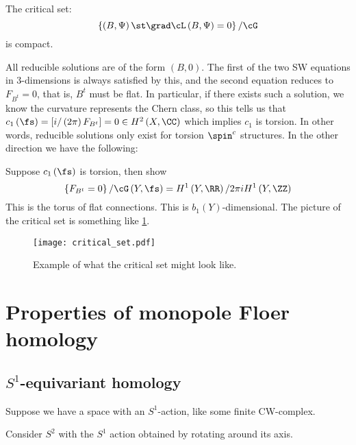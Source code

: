 \documentclass{amsart}
\begin{document}
\begin{fact}
The critical set:
\begin{equation}
\left\{ \left( B , \Psi \right) \st
\grad \cL\left( B , \Psi \right) = 0\right\} / \cG
\end{equation}
is compact.
\end{fact}

All reducible solutions are of the form $\left( B , 0 \right)$.
The first of the two SW equations in $3$-dimensions is always satisfied by this, 
and the second equation reduces to
$F_{B^t} =0$, that is, $B^t$ must be flat.
In particular, if there exists such a solution, 
we know the curvature represents the Chern class, 
so this tells us that $c_1\left( \fs \right) = 
\left[ i / \left( 2\pi \right) F_{B^t}\right] = 
0\in H^2\left( X , \CC \right)$ 
which implies $c_1$ is torsion. 
In other words, reducible solutions only exist for torsion $\spin^c$ structures.
In the other direction we have the following:
\begin{exr}
Suppose $c_1\left( \fs \right)$ is torsion, then show
\begin{equation}
\left\{ F_{B^t} = 0 \right\} / \cG\left( Y , \fs \right)
= H^1\left( Y , \RR \right) / 2\pi i H^1\left( Y , \ZZ \right)
\end{equation}
This is the torus of flat connections.
This is $b_1\left( Y \right)$-dimensional.
The picture of the critical set is something like \cref{fig:critical_set}.
\begin{figure}
\texttt{[image: critical\_set.pdf]}
\caption{Example of what the critical set might look like.}
\label{fig:critical_set}
\end{figure}
\end{exr}

\section{Properties of monopole Floer homology}

\subsection{$S^1$-equivariant homology}

Suppose we have a space with an $S^1$-action, like some finite CW-complex.

\begin{exm}
Consider $S^2$ with the $S^1$ action obtained by rotating around its axis. 
\end{exm}
\end{document}
